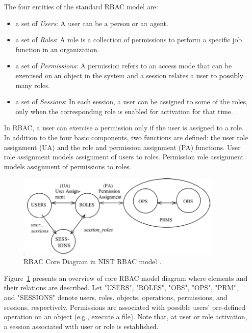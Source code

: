 The four entities of the standard RBAC model are:

\begin{itemize}
\setlength{\itemsep}{0.25pt}
\item a set of \emph{Users}: A user can be a person or an agent.
\item a set of \emph{Roles}: A role is a collection of permissions to perform a specific job function in an organization.
\item a set of \emph{Permissions}: A permission refers to an access mode that can be exercised on an object in the system and a session relates a user to possibly many roles.
\item a set of \emph{Sessions}: In each session, a user can be assigned to some of the roles, only when the corresponding role is enabled for activation for that time.		
\end{itemize}

In RBAC, a user can exercise a permission only if the user is assigned to a role.
In addition to the four basic components, two functions are defined:
the user role assignment (UA) and the role and permission assignment (PA) functions.
User role assignment models assignment of users to roles.
Permission role assignment models assignment of permissions to roles.

\begin{figure}[ht]
    \centering
        \includegraphics[width=4.0in]{sections/core-model.png}
    \caption{\label{fig:overview}RBAC Core Diagram in NIST RBAC model \cite{ferraiolokuhn}.}
\end{figure}

Figure~\ref{fig:overview} presents an overview of core RBAC model diagram where elements and their relations are described.
Let "USERS", "ROLES", "OBS", "OPS", "PRM", and "SESSIONS" denote users, roles, objects, operations, permissions, and sessions, respectively.
Permissions are associated with possible users' pre-defined operation on an object (e.g., execute a file).
Note that, at user or role activation, a session associated with user or role is established.


